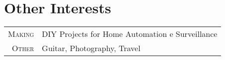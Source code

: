 %
%
%

\section{\texorpdfstring{\color{Blue}Other Interests}{Centres d'intérêts}}
\begin{tabular}{rl}
    \textsc{Making} & DIY Projects for Home Automation e Surveillance \\
    \textsc{Other} & Guitar, Photography, Travel
\end{tabular}
